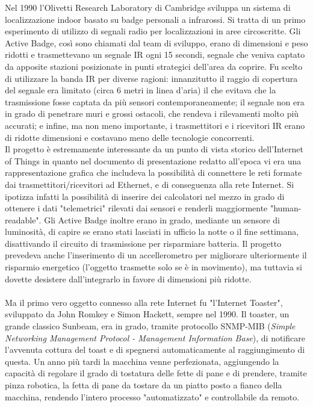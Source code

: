 \vspace{1.0cm}
Nel 1990 l'Olivetti Research Laboratory di Cambridge sviluppa un sistema di localizzazione indoor basato su badge personali a infrarossi. Si tratta di un primo esperimento di utilizzo di segnali radio per localizzazioni in aree circoscritte. Gli Active Badge, così sono chiamati dal team di sviluppo, erano di dimensioni e peso ridotti e trasmettevano un segnale IR ogni 15 secondi, segnale che veniva captato da apposite stazioni posizionate in punti strategici dell'area da coprire. Fu scelto di utilizzare la banda IR per diverse ragioni: innanzitutto il raggio di copertura del segnale era limitato (circa 6 metri in linea d'aria) il che evitava che la trasmissione fosse captata da più sensori contemporaneamente; il segnale non era in grado di penetrare muri e grossi ostacoli, che rendeva i rilevamenti molto più accurati; e infine, ma non meno importante, i trasmettitori e i ricevitori IR erano di ridotte dimensioni e costavano meno delle tecnologie concorrenti.
\\Il progetto è estremamente interessante da un punto di vista storico dell'Internet of Things in quanto nel documento di presentazione redatto all'epoca vi era una rappresentazione grafica che includeva la possibilità di connettere le reti formate dai trasmettitori/ricevitori ad Ethernet, e di conseguenza alla rete Internet. Si ipotizza infatti la possibilità di inserire dei calcolatori nel mezzo in grado di ottenere i dati "telemetrici" rilevati dai sensori e renderli maggiormente "human-readable". Gli Active Badge inoltre erano in grado, mediante un sensore di luminosità, di capire se erano stati lasciati in ufficio la notte o il fine settimana, disattivando il circuito di trasmissione per risparmiare batteria. Il progetto prevedeva anche l'inserimento di un accellerometro per migliorare ulteriormente il risparmio energetico (l'oggetto trasmette solo se è in movimento), ma tuttavia si dovette desistere dall'integrarlo in favore di dimensioni più ridotte.
\\\\Ma il primo vero oggetto connesso alla rete Internet fu "l'Internet Toaster", sviluppato da John Romkey e Simon Hackett, sempre nel 1990. Il toaster, un grande classico Sunbeam, era in grado, tramite protocollo SNMP-MIB (\textit{Simple Networking Management Protocol - Management Information Base}), di notificare l'avvenuta cottura del toast e di spegnersi automaticamente al raggiungimento di questa. Un anno più tardi la macchina venne perfezionata, aggiungendo la capacità di regolare il grado di tostatura delle fette di pane e di prendere, tramite pinza robotica, la fetta di pane da tostare da un piatto posto a fianco della macchina, rendendo l'intero processo "automatizzato" e controllabile da remoto.
